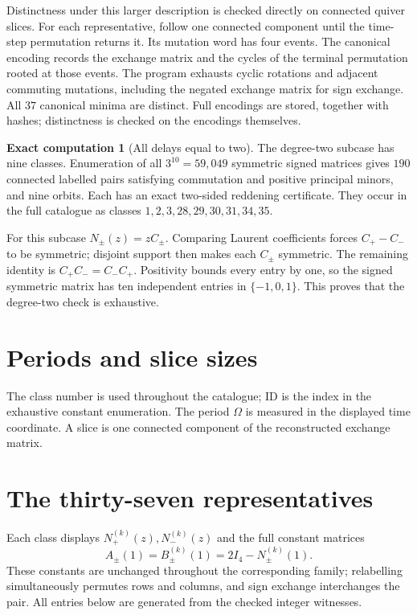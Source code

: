 \documentclass[11pt,a4paper]{article}
\theoremstyle{definition}
\newtheorem{computation}[theorem]{Exact computation}
\begin{document}
Distinctness under this larger description is checked directly on connected
quiver slices. For each representative, follow one connected component
until the time-step permutation returns it. Its mutation word has four
events. The canonical encoding records the exchange matrix and the cycles
of the terminal permutation rooted at those events. The program exhausts
cyclic rotations and adjacent commuting mutations, including the negated
exchange matrix for sign exchange. All $37$ canonical minima are distinct.
Full encodings are stored, together with hashes; distinctness is checked
on the encodings themselves.

\begin{computation}[All delays equal to two]\label{comp:degree2}
The degree-two subcase has nine classes. Enumeration of all $3^{10}=59,049$
symmetric signed matrices gives $190$ connected labelled pairs satisfying
commutation and positive principal minors, and nine orbits. Each has an
exact two-sided reddening certificate. They occur in the full catalogue
as classes $1,2,3,28,29,30,31,34,35$.
\end{computation}

For this subcase $N_\pm(z)=zC_\pm$. Comparing Laurent coefficients forces
$C_+-C_-$ to be symmetric; disjoint support then makes each $C_\pm$
symmetric. The remaining identity is $C_+C_-=C_-C_+$. Positivity bounds
every entry by one, so the signed symmetric matrix has ten independent
entries in $\{-1,0,1\}$. This proves that the degree-two check is exhaustive.

\clearpage
\section{Periods and slice sizes}\label{sec:periods}
The class number is used throughout the catalogue; ID is the index in the
exhaustive constant enumeration. The period $\Omega$ is measured in the
displayed time coordinate. A slice is one connected component of the
reconstructed exchange matrix.
\begin{center}\small\renewcommand{\arraystretch}{1.1}

\end{center}
\vfill

\clearpage
\section{The thirty-seven representatives}\label{sec:catalogue}
Each class displays $N_+^{(k)}(z),N_-^{(k)}(z)$ and the full constant matrices
\[
 A_\pm(1)=B_\pm^{(k)}(1)=2I_4-N_\pm^{(k)}(1).
\]
These constants are unchanged throughout the corresponding family;
relabelling simultaneously permutes rows and columns, and sign exchange
interchanges the pair. All entries below are generated from the checked
integer witnesses.

\end{document}
